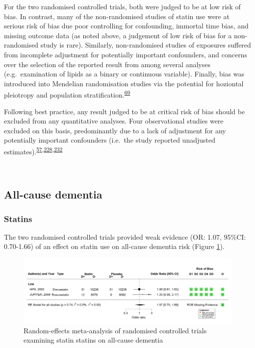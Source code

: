\documentclass[a4paper, twoside]{templates/ociamthesis}
\begin{document}
For the two randomised controlled trials, both were judged to be at low risk of bias. In contrast, many of the non-randomised studies of statin use were at serious risk of bias due poor controlling for confounding, immortal time bias, and missing outcome data (as noted above, a judgement of low risk of bias for a non-randomised study is rare). Similarly, non-randomised studies of exposures suffered from incomplete adjustment for potentially important confounders, and concerns over the selection of the reported result from among several analyses (e.g.~examination of lipids as a binary or continuous variable). Finally, bias was introduced into Mendelian randomisation studies via the potential for hoziontal pleiotropy and population stratification.\textsuperscript{\protect\hyperlink{ref-davies2018}{69}}

Following best practice, any result judged to be at critical risk of bias should be excluded from any quantitative analyses. Four observational studies were excluded on this basis, predominantly due to a lack of adjustment for any potentially important confounders (i.e.~the study reported unadjusted estimates).\textsuperscript{\protect\hyperlink{ref-mainous2005}{57},\protect\hyperlink{ref-kuo2015}{228},\protect\hyperlink{ref-notkola1998}{232}}

~

\hypertarget{sys-rev-res-Dementia}{%
\subsection{All-cause dementia}\label{sys-rev-res-Dementia}}

\hypertarget{statins}{%
\subsubsection{Statins}\label{statins}}

The two randomised controlled trials provided weak evidence (OR: 1.07, 95\%CI: 0.70-1.66) of an effect on statin use on all-cause dementia risk (Figure \ref{fig:rctStatinDementiaFig}).





\begin{figure}[H]
\includegraphics[width=1\linewidth]{figures/sys-rev/fp_rct_statins_Dementia} \caption[Random-effects meta-analysis of statins on all-cause dementia]{Random-effects meta-analysis of randomised controlled trials examining statin statins on all-cause dementia}\label{fig:rctStatinDementiaFig}
\end{figure}
\end{document}
